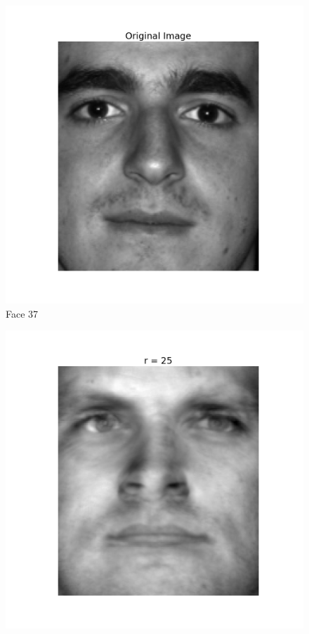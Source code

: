 \begin{enumerate}[label=\arabic*.]
\begin{mdframed}[style=MyFrame]
\begin{figure}[H]
                    \includegraphics[height=0.35\textheight]{../media/original-image-2.png}
                    \caption{Face 37}
                \end{figure}
                \begin{figure}[H]
                    \includegraphics[height=0.35\textheight]{../media/r-25-2.png}

\end{figure}
\end{mdframed}
\end{enumerate}
